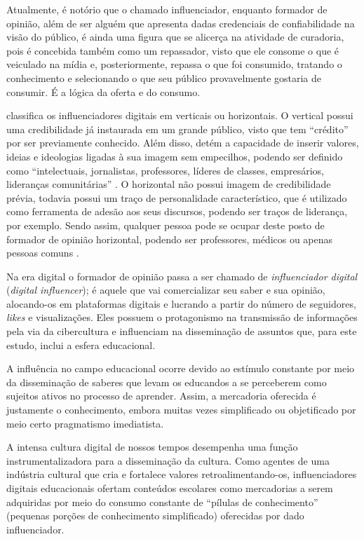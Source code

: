 \documentclass[portuguese]{textolivre}
\begin{document}
Atualmente, é notório que o chamado influenciador, enquanto formador de opinião, além de ser alguém que apresenta dadas credenciais de confiabilidade na visão do público, é ainda uma figura que se alicerça na atividade de curadoria, pois é concebida também como um repassador, visto que ele consome o que é veiculado na mídia e, posteriormente, repassa o que foi consumido, tratando o conhecimento e selecionando o que seu público provavelmente gostaria de consumir. É a lógica da oferta e do consumo.  

\textcite{karhawi_influenciadores_2017} classifica os influenciadores digitais em verticais ou horizontais. O vertical possui uma credibilidade já instaurada em um grande público, visto que tem “crédito” por ser previamente conhecido. Além disso, detém a capacidade de inserir valores, ideias e ideologias ligadas à sua imagem sem empecilhos, podendo ser definido como “intelectuais, jornalistas, professores, líderes de classes, empresários, lideranças comunitárias” \cite[p. 52]{karhawi_influenciadores_2017}. O horizontal não possui imagem de credibilidade prévia, todavia possui um traço de personalidade característico, que é utilizado como ferramenta de adesão aos seus discursos, podendo ser traços de liderança, por exemplo. Sendo assim, qualquer pessoa pode se ocupar deste posto de formador de opinião horizontal, podendo ser professores, médicos ou apenas pessoas comuns \cite{karhawi_influenciadores_2017,resende_professores_2020}. 

Na era digital o formador de opinião passa a ser chamado de \textit{influenciador digital} (\textit{digital influencer}); é aquele que vai comercializar seu saber e sua opinião, alocando-os em plataformas digitais e lucrando a partir do número de seguidores, \textit{likes} e visualizações. Eles possuem o protagonismo na transmissão de informações pela via da cibercultura e influenciam na disseminação de assuntos que, para este estudo, inclui a esfera educacional.

A influência no campo educacional ocorre devido ao estímulo constante por meio da disseminação de saberes que levam os educandos a se perceberem como sujeitos ativos no processo de aprender. Assim, a mercadoria oferecida é justamente o conhecimento, embora muitas vezes simplificado ou objetificado por meio certo pragmatismo imediatista.

A intensa cultura digital de nossos tempos desempenha uma função instrumentalizadora para a disseminação da cultura. Como agentes de uma indústria cultural \cite{adorno_dialetica_1985} que cria e fortalece valores retroalimentando-os, influenciadores digitais educacionais ofertam conteúdos escolares como mercadorias a serem adquiridas por meio do consumo constante de “pílulas de conhecimento” (pequenas porções de conhecimento simplificado) oferecidas por dado influenciador. 
\end{document}

